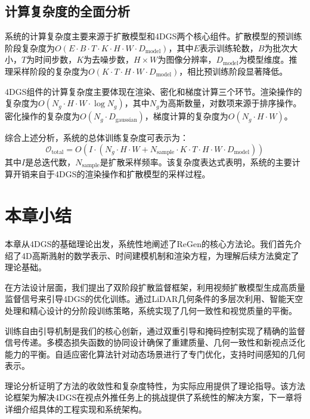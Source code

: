 \subsection{计算复杂度的全面分析}

系统的计算复杂度主要来源于扩散模型和4DGS两个核心组件。扩散模型的预训练阶段复杂度为$O(E \cdot B \cdot T \cdot K \cdot H \cdot W \cdot D_{\text{model}})$，其中$E$表示训练轮数，$B$为批次大小，$T$为时间步数，$K$为去噪步数，$H \times W$为图像分辨率，$D_{\text{model}}$为模型维度。推理采样阶段的复杂度为$O(K \cdot T \cdot H \cdot W \cdot D_{\text{model}})$，相比预训练阶段显著降低。

4DGS组件的计算复杂度主要体现在渲染、密化和梯度计算三个环节。渲染操作的复杂度为$O(N_g \cdot H \cdot W \cdot \log N_g)$，其中$N_g$为高斯数量，对数项来源于排序操作。密化操作的复杂度为$O(N_g \cdot D_{\text{gaussian}})$，梯度计算的复杂度为$O(N_g \cdot H \cdot W)$。

综合上述分析，系统的总体训练复杂度可表示为：
\begin{equation}
\mathcal{O}_{\text{total}} = O(I \cdot (N_g \cdot H \cdot W + N_{\text{sample}} \cdot K \cdot T \cdot H \cdot W \cdot D_{\text{model}}))
\label{eq:total_complexity}
\end{equation}
其中$I$是总迭代数，$N_{\text{sample}}$是扩散采样频率。该复杂度表达式表明，系统的主要计算开销来自于4DGS的渲染操作和扩散模型的采样过程。

\section{本章小结}

本章从4DGS的基础理论出发，系统性地阐述了ReGen的核心方法论。我们首先介绍了4D高斯溅射的数学表示、时间建模机制和渲染方程，为理解后续方法奠定了理论基础。

在方法设计层面，我们提出了双阶段扩散监督框架，利用视频扩散模型生成高质量监督信号来引导4DGS的优化训练。通过LiDAR几何条件的多层次利用、智能天空处理和精心设计的分阶段训练策略，系统实现了几何一致性和视觉质量的平衡。

训练自由引导机制是我们的核心创新，通过双重引导和掩码控制实现了精确的监督信号传递。多模态损失函数的协同设计确保了重建质量、几何一致性和新视点泛化能力的平衡。自适应密化算法针对动态场景进行了专门优化，支持时间感知的几何表示。

理论分析证明了方法的收敛性和复杂度特性，为实际应用提供了理论指导。该方法论框架为解决4DGS在视点外推任务上的挑战提供了系统性的解决方案，下一章将详细介绍具体的工程实现和系统架构。
